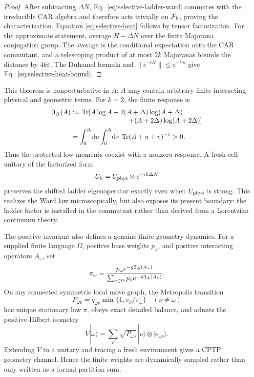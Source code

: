 \begin{proof}
After subtracting \(\Delta N\), Eq.~\eqref{eq:selective-ladder-ward}
commutes with the irreducible CAR algebra and therefore acts trivially on
\(\mathcal F_k\), proving the characterization.  Equation
\eqref{eq:selective-heat} follows by tensor factorization.  For the
approximate statement, average \(H-\Delta N\) over the finite Majorana
conjugation group.  The average is the conditional expectation onto the
CAR commutant, and a telescoping product of at most \(2k\) Majoranas bounds
the distance by \(4k\varepsilon\).  The Duhamel formula and
\(\|e^{-tH}\|\leq e^{-tm}\) give
Eq.~\eqref{eq:selective-heat-bound}.
\end{proof}

This theorem is nonperturbative in \(A\): \(A\) may contain arbitrary
finite interacting physical and geometric terms.  For \(k=2\), the finite
response is
\begin{align}
 \I_\Delta(A)
 &:=
 \Tr\!\left[
 A\log A-2(A+\Delta)\log(A+\Delta)\right.\nonumber\\[-1mm]
 &\hspace{29mm}\left.
 +(A+2\Delta)\log(A+2\Delta)\right]\nonumber\\
 &=\int_0^\Delta\!\diff u\int_0^\Delta\!\diff v\,
 \Tr(A+u+v)^{-1}>0 .
 \label{eq:selective-invariant}
\end{align}
Thus the protected low moments coexist with a nonzero response.  A fresh-cell
unitary of the factorized form
\[
 U_h=U_{\rm phys}\otimes e^{-ih\Delta N}
\]
preserves the shifted ladder eigenoperator exactly even when
\(U_{\rm phys}\) is strong.  This realizes the Ward law microscopically, but
also exposes its present boundary: the ladder factor is installed in the
commutant rather than derived from a Lorentzian continuum theory.

The positive invariant also defines a genuine finite geometry dynamics.
For a supplied finite language \(\Omega\), positive base weights
\(p_\omega\), and positive interacting operators \(A_\omega\), set
\begin{equation}
 \pi_\omega=
 \frac{p_\omega e^{-g\mathfrak I_\Delta(A_\omega)}}
 {\sum_{\nu\in\Omega}p_\nu e^{-g\mathfrak I_\Delta(A_\nu)}} .
 \label{eq:selective-geometry-law}
\end{equation}
On any connected symmetric local move graph, the Metropolis transition
\[
 P_{\omega\nu}=q_{\omega\nu}
 \min\{1,\pi_\nu/\pi_\omega\}
\quad(\nu\neq\omega)
\]
has unique stationary law \(\pi\), obeys exact detailed balance, and admits
the positive-Hilbert isometry
\begin{equation}
 V|\omega\rangle
 =\sum_\nu\sqrt{P_{\omega\nu}}\,
 |\nu\rangle\otimes|e_{\omega\nu}\rangle .
 \label{eq:selective-stinespring}
\end{equation}
Extending \(V\) to a unitary and tracing a fresh environment gives a CPTP
geometry channel.  Hence the finite weights are dynamically sampled rather
than only written as a formal partition sum.

